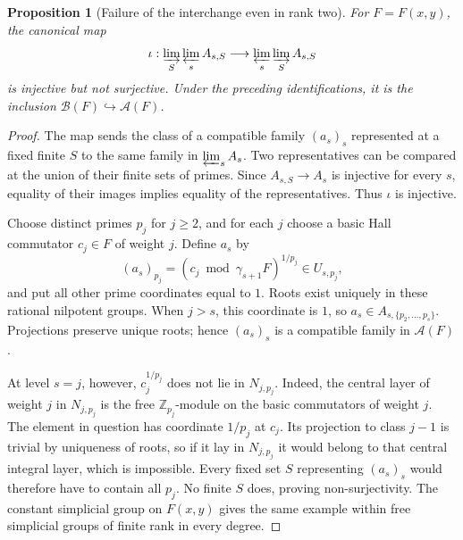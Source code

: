 \documentclass[11pt,a4paper]{article}
\newtheorem{proposition}[theorem]{Proposition}
\begin{document}
\begin{proposition}[Failure of the interchange even in rank two]
\label{adelic-noninterchange}
For $F=F(x,y)$, the canonical map
\[
 \iota:\varinjlim_S\varprojlim_sA_{s,S}
       \longrightarrow\varprojlim_s\varinjlim_SA_{s,S}
\]
is injective but not surjective.  Under the preceding identifications,
it is the inclusion $\mathcal B(F)\hookrightarrow\mathcal A(F)$.
\end{proposition}
\begin{proof}
The map sends the class of a compatible family $(a_s)_s$ represented
at a fixed finite $S$ to the same family in $\varprojlim_sA_s$.
Two representatives can be compared at the union of their finite sets
of primes.  Since $A_{s,S}\to A_s$ is injective for every $s$, equality
of their images implies equality of the representatives.  Thus $\iota$
is injective.

Choose distinct primes $p_j$ for $j\geq2$, and for each $j$ choose a
basic Hall commutator $c_j\in F$ of weight $j$.  Define $a_s$ by
\[
 (a_s)_{p_j}=(c_j\bmod\gamma_{s+1}F)^{1/p_j}\in U_{s,p_j},
\]
and put all other prime coordinates equal to $1$.  Roots exist uniquely
in these rational nilpotent groups.  When $j>s$, this coordinate is $1$,
so $a_s\in A_{s,\{p_2,\ldots,p_s\}}$.  Projections preserve unique
roots; hence $(a_s)_s$ is a compatible family in $\mathcal A(F)$.

At level $s=j$, however, $c_j^{1/p_j}$ does not lie in $N_{j,p_j}$.
Indeed, the central layer of weight $j$ in $N_{j,p_j}$ is the free
$\mathbb Z_{p_j}$-module on the basic commutators of weight $j$.
The element in question has coordinate $1/p_j$ at $c_j$.  Its projection
to class $j-1$ is trivial by uniqueness of roots, so if it lay in
$N_{j,p_j}$ it would belong to that central integral layer, which is
impossible.  Every fixed set $S$ representing $(a_s)_s$ would therefore
have to contain all $p_j$.  No finite $S$ does, proving non-surjectivity.
The constant simplicial group on $F(x,y)$ gives the same example within
free simplicial groups of finite rank in every degree.
\end{proof}
\end{document}
